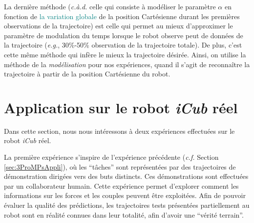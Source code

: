 \documentclass[utf8]{frontiersSCNS} %
\newcommand{\toimprove}[1]{\textcolor{teal}{#1}}
\begin{document}
La dernière méthode (\textit{c.à.d.} celle qui consiste à modéliser le paramètre $\alpha$ en fonction de \toimprove{la variation globale} de la position Cartésienne durant les premières observations de la trajectoire) est celle qui permet au mieux d'approximer le paramètre de modulation du temps lorsque le robot observe peut de données de la trajectoire (\textit{e.g.}, 30\%-50\% observation de la trajectoire totale).  De plus, c'est cette même méthode qui infère le mieux la trajectoire désirée. Ainsi, on utilise la méthode de la \textit{modélisation} pour nos expériences, quand il s'agit de reconnaître la trajectoire à partir de la position Cartésienne du robot.



\section{Application sur le robot \textit{iCub} réel}
\label{sec:appliRealIcub}

Dans cette section, nous nous intéressons à deux expériences effectuées sur le robot \textit{iCub} réel.

La première expérience s'inspire de l'expérience précédente (\textit{c.f.} Section \ref{sec:3ProMPsAppli}), où les  ``tâches'' sont représentées par des trajectoires de démonstration dirigées vers des buts distincts. Ces démonstrations sont effectuées par un collaborateur humain. Cette expérience permet d'explorer comment les informations sur les forces et les couples peuvent être exploitées. 
Afin de pouvoir évaluer la qualité des prédictions, les trajectoires tests présentées partiellement au robot sont en réalité connues dans leur totalité, afin d'avoir une ``vérité terrain''.

\end{document}
